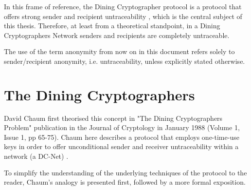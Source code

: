 In this frame of reference, the Dining Cryptographer protocol is a protocol that offers strong sender and recipient untraceability \cite{Chaum}, which is the central subject of this thesis. Therefore, at least from a theoretical standpoint, in a Dining Cryptographers Network senders and recipients are completely untraceable. 

The use of the term anonymity from now on in this document refers solely to sender/recipient anonymity, i.e. untraceability, unless explicitly stated otherwise.

\section{The Dining Cryptographers}
David Chaum first theorised this concept in "The Dining Cryptographers Problem" publication in the Journal of Cryptology in January 1988 (Volume 1, Issue 1, pp 65-75). Chaum here describes a protocol that employs one-time-use keys in order to offer unconditional sender and receiver untraceability within a network (a DC-Net) \cite{Chaum}. 

To simplify the understanding of the underlying techniques of the protocol to the reader, Chaum's analogy is presented first, followed by a more formal exposition.

